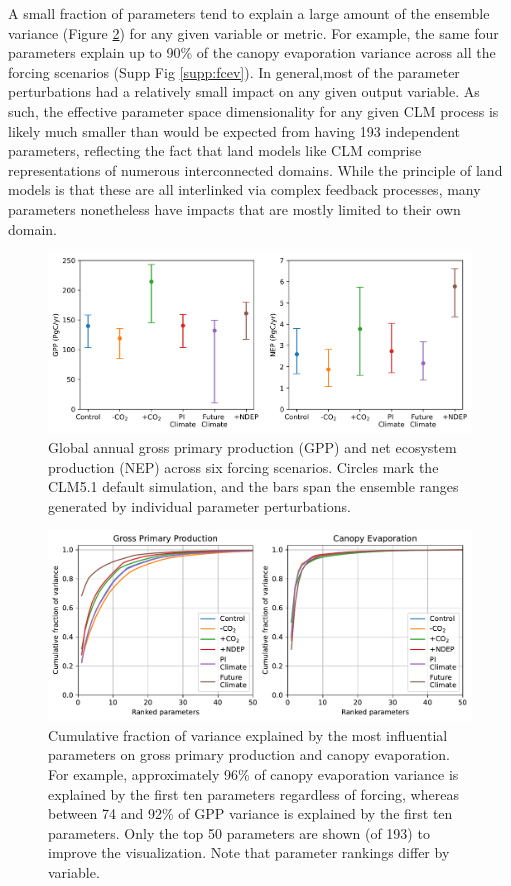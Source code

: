 \documentclass[draft]{agujournal2019}
\begin{document}
A small fraction of parameters tend to explain a large amount of the ensemble variance (Figure \ref{fig:variance}) for any given variable or metric. For example, the same four parameters explain up to 90\% of the canopy evaporation variance across all the forcing scenarios (Supp Fig \ref{supp:fcev}). In general,most of the parameter perturbations had a relatively small impact on any given output variable. As such, the effective parameter space dimensionality for any given CLM process is likely much smaller than would be expected from having 193 independent parameters, reflecting the fact that land models like CLM comprise representations of numerous interconnected domains. While the principle of land models is that these are all interlinked via complex feedback processes, many parameters nonetheless have impacts that are mostly limited to their own domain. 

\begin{figure}[h]
\centering
\includegraphics[width=\textwidth]{../figs/ranges.png}
\caption{Global annual gross primary production (GPP) and net ecosystem production (NEP) across six forcing scenarios. Circles mark the CLM5.1 default simulation, and the bars span the ensemble ranges generated by individual parameter perturbations.}
\label{fig:ranges}
\end{figure}

\begin{figure}[h]
\centering
\includegraphics[width=\textwidth]{../figs/variance.pdf}
\caption{Cumulative fraction of variance explained by the most influential parameters on gross primary production and canopy evaporation. For example, approximately 96\% of canopy evaporation variance is explained by the first ten parameters regardless of forcing, whereas between 74 and 92\% of GPP variance is explained by the first ten parameters. Only the top 50 parameters are shown (of 193) to improve the visualization. Note that parameter rankings differ by variable.}
\label{fig:variance}
\end{figure}
\end{document}
